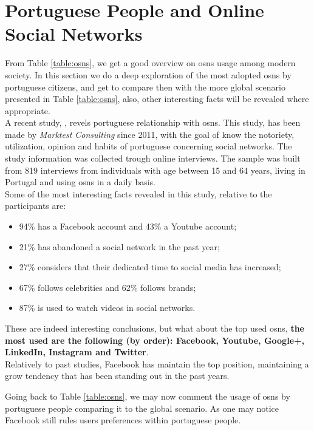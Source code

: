 \section{Portuguese People and Online Social Networks}
From Table \ref{table:osns}, we get a good overview on \glspl{osn} usage among modern society. In this section we do a deep exploration of the most adopted \glspl{osn} by portuguese citizens,
and get to compare then with the more global scenario presented in Table \ref{table:osns}, also, other interesting facts will be revealed where appropriate.\\
\indent A recent study, \cite{marktest2016}, revels portuguese relationship with \glspl{osn}. This study, has been made by \textit{Marktest Consulting} since 2011, with the goal of know the notoriety, utilization, opinion
and habits of portuguese concerning social networks. The study information was collected trough online interviews. The sample was built from 819 interviews from individuals with age between
15 and 64 years, living in Portugal and using \glspl{osn} in a daily basis.\\
\indent Some of the most interesting facts revealed in this study, relative to the participants are:
\begin{itemize}
  \item 94\% has a Facebook account and 43\% a Youtube account;
  \item 21\% has abandoned a social network in the past year;
  \item 27\% considers that their dedicated time to social media has increased;
  \item 67\% follows celebrities and 62\% follows brands;
  \item 87\% is used to watch videos in social networks.
\end{itemize}

\indent These are indeed interesting conclusions, but what about the top used \glspl{osn}, \textbf{the most used are
the following (by order): Facebook, Youtube, Google+, LinkedIn, Instagram and Twitter}.\\
\indent Relatively to \cite{marktest2016} past studies, Facebook has maintain
the top position, maintaining a grow tendency that has been standing out in the past years.

\indent Going back to Table \ref{table:osns}, we may now comment the usage of \glspl{osn} by portuguese people comparing it
to the global scenario. As one may notice Facebook still rules users preferences within portuguese people.

